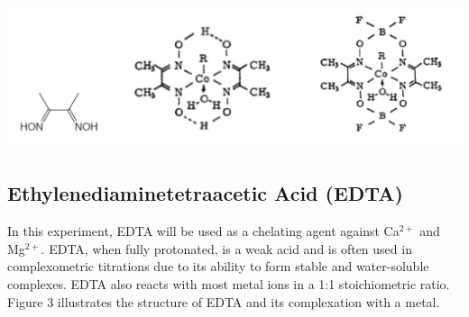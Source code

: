 \documentclass{article}
\begin{document}
\begin{center}
    \includegraphics[scale=0.6]{struc}
\end{center}

\subsection{Ethylenediaminetetraacetic Acid (EDTA)}
In this experiment, EDTA will be used as a chelating agent against Ca$^{2+}$ and
Mg$^{2+}$.  EDTA, when fully protonated, is a weak acid and is often used in complexometric titrations
due to its ability to form stable and water-soluble complexes. EDTA also reacts
with most metal ions in a 1:1 stoichiometric ratio.  Figure 3 illustrates the
structure of EDTA and its complexation with a metal.
\end{document}
